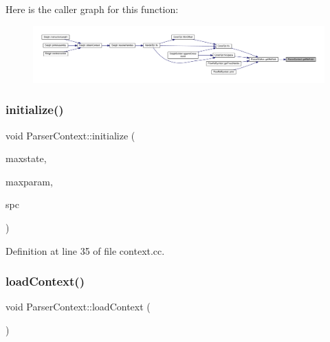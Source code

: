 Here is the caller graph for this function\+:
\nopagebreak
\begin{figure}[H]
\begin{center}
\leavevmode
\includegraphics[width=350pt]{class_parser_context_a98d90338dd2a0605dc74a220fa0a1eb7_icgraph}
\end{center}
\end{figure}
\mbox{\label{class_parser_context_ac8c76cf5ca381b1aedff9adb6334547c}} 
\subsubsection{\texorpdfstring{initialize()}{initialize()}}
{\footnotesize\ttfamily void Parser\+Context\+::initialize (\begin{DoxyParamCaption}\item[{int4}]{maxstate,  }\item[{int4}]{maxparam,  }\item[{\mbox{\hyperlink{class_addr_space}{Addr\+Space}} $\ast$}]{spc }\end{DoxyParamCaption})}



Definition at line 35 of file context.\+cc.

\mbox{\label{class_parser_context_af07fe028f5e411bdb414b1683bd4c3b6}} 
\subsubsection{\texorpdfstring{loadContext()}{loadContext()}}
{\footnotesize\ttfamily void Parser\+Context\+::load\+Context (\begin{DoxyParamCaption}\item[{void}]{ }\end{DoxyParamCaption})\hspace{0.3cm}{\ttfamily [inline]}}



